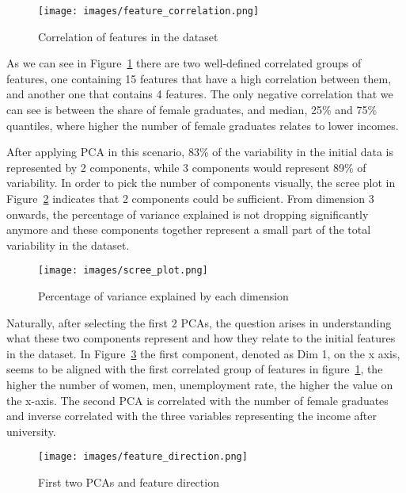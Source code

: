 \documentclass[11pt]{article}
\begin{document}
\begin{figure} [H]
    \begin{center}
        \texttt{[image: images/feature\_correlation.png]}
        \caption{Correlation of features in the dataset}
        \label{fig:featurecorrelation}
    \end{center}
\end{figure}

As we can see in Figure~\ref{fig:featurecorrelation} there are two well-defined correlated groups of features, one containing 15 features that have a high correlation between them, and another one that contains 4 features. The only negative correlation that we can see is between the share of female graduates, and median, 25\% and 75\% quantiles, where higher the number of female graduates relates to lower incomes.

After applying PCA in this scenario, 83\% of the variability in the initial data is represented by 2 components, while 3 components would represent 89\% of variability. In order to pick the number of components visually, the scree plot in Figure~\ref{fig:screeplot} indicates that 2 components could be sufficient. From dimension 3 onwards, the percentage of variance explained is not dropping significantly anymore and these components together represent a small part of the total variability in the dataset.

\begin{figure} [H]
    \begin{center}
        \texttt{[image: images/scree\_plot.png]}
        \caption{Percentage of variance explained by each dimension}
        \label{fig:screeplot}
    \end{center}
\end{figure}

Naturally, after selecting the first 2 PCAs, the question arises in understanding what these two components represent and how they relate to the initial features in the dataset. In Figure~\ref{fig:featuredirection} the first component, denoted as Dim 1, on the x axis, seems to be aligned with the first correlated group of features in figure~\ref{fig:featurecorrelation}, the higher the number of women, men, unemployment rate, the higher the value on the x-axis. The second PCA is correlated with the number of female graduates and inverse correlated with the three variables representing the income after university.

\begin{figure} [H]
    \begin{center}
        \texttt{[image: images/feature\_direction.png]}
        \caption{First two PCAs and feature direction}
        \label{fig:featuredirection}
    \end{center}
\end{figure}
\end{document}

